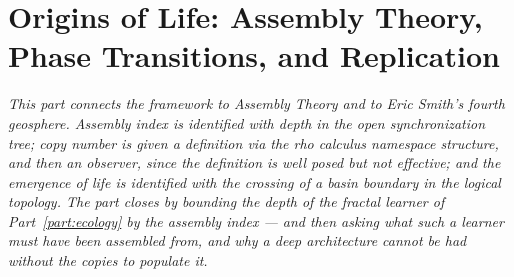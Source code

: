 \documentclass[12pt,openright,twoside]{book}
\theoremstyle{remark}
\theoremstyle{plain}
\theoremstyle{remark}
\theoremstyle{plain}
\theoremstyle{plain}
\begin{document}
\bigskip


\part{Origins of Life: Assembly Theory, Phase Transitions, and Replication}
\label{part:origins}

\vspace{1em}
\begin{mdframed}[backgroundcolor=remarkgray, linecolor=gray!60,
                 linewidth=1pt, topline=false, rightline=false,
                 bottomline=false]
\small\itshape
This part connects the framework to Assembly Theory and to Eric Smith's
fourth geosphere.
Assembly index is identified with depth in the open synchronization tree;
copy number is given a definition via the rho calculus namespace
structure, and then an observer, since the definition is well posed but
not effective; and the emergence of life is identified with the crossing
of a basin boundary in the logical topology.
The part closes by bounding the depth of the fractal learner of
Part~\ref{part:ecology} by the assembly index --- and then asking what
such a learner must have been assembled from, and why a deep architecture
cannot be had without the copies to populate it.
\end{mdframed}

\bigskip

\end{document}
